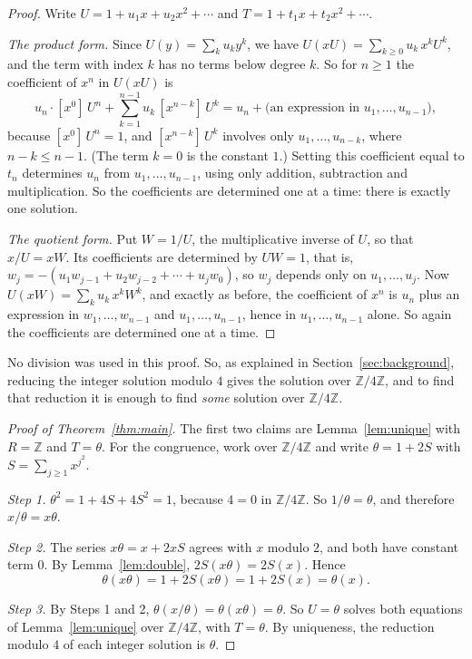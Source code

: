 \documentclass[11pt,a4paper]{article}
\theoremstyle{definition}
\theoremstyle{remark}
\newcommand{\Z}{\mathbb{Z}}
\newcommand{\coeff}[2]{[x^{#1}]\,#2}
\begin{document}
\begin{proof}
Write $U=1+u_1x+u_2x^2+\cdots$ and $T=1+t_1x+t_2x^2+\cdots$.

\emph{The product form.} Since $U(y)=\sum_ku_ky^k$, we have $U(xU)=\sum_{k\ge0}u_k\,x^kU^k$, and the term with index $k$
has no terms below degree $k$. So for $n\ge1$ the coefficient of $x^n$ in $U(xU)$ is
\[
u_n\cdot\coeff{0}{U^n}+\sum_{k=1}^{n-1}u_k\,\coeff{n-k}{U^k}
=u_n+\bigl(\text{an expression in }u_1,\dots,u_{n-1}\bigr),
\]
because $\coeff{0}{U^n}=1$, and $\coeff{n-k}{U^k}$ involves only $u_1,\dots,u_{n-k}$, where $n-k\le n-1$. (The term
$k=0$ is the constant $1$.) Setting this coefficient equal to $t_n$ determines $u_n$ from $u_1,\dots,u_{n-1}$, using only
addition, subtraction and multiplication. So the coefficients are determined one at a time: there is exactly one
solution.

\emph{The quotient form.} Put $W=1/U$, the multiplicative inverse of $U$, so that $x/U=xW$. Its coefficients are
determined by $UW=1$, that is, $w_j=-(u_1w_{j-1}+u_2w_{j-2}+\cdots+u_jw_0)$, so $w_j$ depends only on $u_1,\dots,u_j$.
Now $U(xW)=\sum_ku_k\,x^kW^k$, and exactly as before, the coefficient of $x^n$ is $u_n$ plus an expression in
$w_1,\dots,w_{n-1}$ and $u_1,\dots,u_{n-1}$, hence in $u_1,\dots,u_{n-1}$ alone. So again the coefficients are determined
one at a time.
\end{proof}

No division was used in this proof. So, as explained in Section~\ref{sec:background}, reducing the integer solution
modulo $4$ gives the solution over $\Z/4\Z$, and to find that reduction it is enough to find \emph{some} solution over
$\Z/4\Z$.

\begin{proof}[Proof of Theorem~\ref{thm:main}]
The first two claims are Lemma~\ref{lem:unique} with $R=\Z$ and $T=\theta$. For the congruence, work over $\Z/4\Z$ and
write $\theta=1+2S$ with $S=\sum_{j\ge1}x^{j^2}$.

\emph{Step 1.} $\theta^2=1+4S+4S^2=1$, because $4=0$ in $\Z/4\Z$. So $1/\theta=\theta$, and therefore
$x/\theta=x\theta$.

\emph{Step 2.} The series $x\theta=x+2xS$ agrees with $x$ modulo $2$, and both have constant term $0$. By
Lemma~\ref{lem:double}, $2S(x\theta)=2S(x)$. Hence
\[
\theta(x\theta)=1+2S(x\theta)=1+2S(x)=\theta(x).
\]

\emph{Step 3.} By Steps 1 and 2, $\theta(x/\theta)=\theta(x\theta)=\theta$. So $U=\theta$ solves both equations of
Lemma~\ref{lem:unique} over $\Z/4\Z$, with $T=\theta$. By uniqueness, the reduction modulo $4$ of each integer solution
is $\theta$.
\end{proof}
\end{document}
